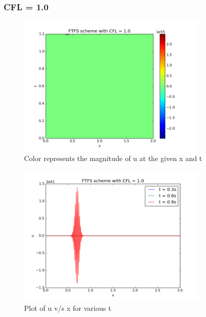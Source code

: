 \documentclass[11pt, a4paper]{article}
\begin{document}
\subsubsection{CFL = 1.0}
\begin{figure}[H]
 \centering
 \includegraphics[width = 0.8\textwidth]{FTFS3_1.png}
 \caption{Color represents the magnitude of u at the given x and t}
\end{figure}

\begin{figure}[H]
 \centering
 \includegraphics[width = 0.8\textwidth]{FTFS3_1_1.png}
 \caption{Plot of u v/s x for various t}
\end{figure}
\end{document}
